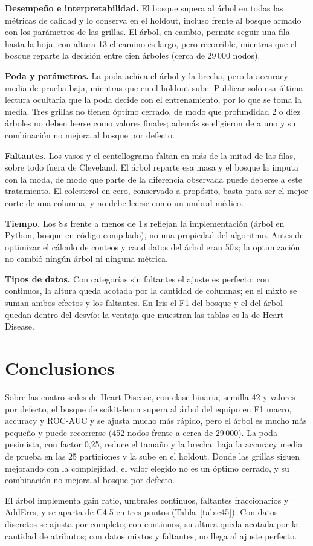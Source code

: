\documentclass{llncs}
\begin{document}
\textbf{Desempeño e interpretabilidad.} El bosque supera al árbol en todas las métricas de calidad y lo conserva en el holdout, incluso frente al bosque armado con los parámetros de las grillas. El árbol, en cambio, permite seguir una fila hasta la hoja; con altura 13 el camino es largo, pero recorrible, mientras que el bosque reparte la decisión entre cien árboles (cerca de 29\,000 nodos).

\textbf{Poda y parámetros.} La poda achica el árbol y la brecha, pero la accuracy media de prueba baja, mientras que en el holdout sube. Publicar solo esa última lectura ocultaría que la poda decide con el entrenamiento, por lo que se toma la media. Tres grillas no tienen óptimo cerrado, de modo que profundidad 2 o diez árboles no deben leerse como valores finales; además se eligieron de a uno y su combinación no mejora al bosque por defecto.

\textbf{Faltantes.} Los vasos y el centellograma faltan en más de la mitad de las filas, sobre todo fuera de Cleveland. El árbol reparte esa masa y el bosque la imputa con la moda, de modo que parte de la diferencia observada puede deberse a este tratamiento. El colesterol en cero, conservado a propósito, basta para ser el mejor corte de una columna, y no debe leerse como un umbral médico.

\textbf{Tiempo.} Los 8\,s frente a menos de 1\,s reflejan la implementación (árbol en Python, bosque en código compilado), no una propiedad del algoritmo. Antes de optimizar el cálculo de conteos y candidatos del árbol eran 50\,s; la optimización no cambió ningún árbol ni ninguna métrica.

\textbf{Tipos de datos.} Con categorías sin faltantes el ajuste es perfecto; con continuos, la altura queda acotada por la cantidad de columnas; en el mixto se suman ambos efectos y los faltantes. En Iris el F1 del bosque y el del árbol quedan dentro del desvío: la ventaja que muestran las tablas es la de Heart Disease.

\FloatBarrier
\section{Conclusiones}
\label{sec:conclusiones}

Sobre las cuatro sedes de Heart Disease, con clase binaria, semilla 42 y valores por defecto, el bosque de scikit-learn supera al árbol del equipo en F1 macro, accuracy y ROC-AUC y se ajusta mucho más rápido, pero el árbol es mucho más pequeño y puede recorrerse (452 nodos frente a cerca de 29\,000). La poda pesimista, con factor 0,25, reduce el tamaño y la brecha: baja la accuracy media de prueba en las 25 particiones y la sube en el holdout. Donde las grillas siguen mejorando con la complejidad, el valor elegido no es un óptimo cerrado, y su combinación no mejora al bosque por defecto.

El árbol implementa gain ratio, umbrales continuos, faltantes fraccionarios y AddErrs, y se aparta de C4.5 en tres puntos (Tabla~\ref{tab:c45}). Con datos discretos se ajusta por completo; con continuos, su altura queda acotada por la cantidad de atributos; con datos mixtos y faltantes, no llega al ajuste perfecto.



\end{document}
